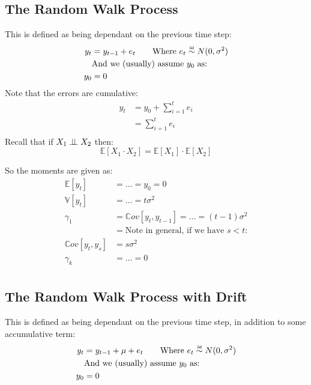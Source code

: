 \subsection{The Random Walk Process}
This is defined as being dependant on the previous time step:
\begin{equation*}
    \begin{aligned}
        y_t &= y_{t-1} + e_t \qquad \text{Where $e_t \iid N(0, \sigma^2)$} \\
            &\text{And we (usually) assume $y_0$ as:} \\
        y_0 &= 0 \\
    \end{aligned}
\end{equation*}
Note that the errors are cumulative:
\begin{equation*}
    \begin{aligned}
        y_t &= y_0 + \sum_{i=1}^{t} e_i \\
            &= \sum_{i=1}^{t} e_i \\
    \end{aligned}
\end{equation*}
Recall that if $X_1 \perp \!\!\! \perp X_2$ then:
\begin{equation*}
        \mathbb{E}[X_1 \cdot X_2] = \mathbb{E}[X_1] \cdot \mathbb{E}[X_2]
\end{equation*}

So the moments are given as:
\begin{equation*}
    \begin{aligned}
        \mathbb{E}[y_t] &= \dots = y_0 = 0  \\
        \mathbb{V}[y_t] &= \dots = t\sigma^2\\
        \gamma_1 &= \mathbb{C}ov[y_t, y_{t-1}] = \dots = (t-1) \sigma^2 \\
                 &= \text{Note in general, if we have $s < t$:} \\
        \mathbb{C}ov[y_t, y_s] &= s \sigma^2 \\
        \gamma_k &= \dots = 0 \\
    \end{aligned}
\end{equation*}


\subsection{The Random Walk Process with Drift}
This is defined as being dependant on the previous time step, in addition to
some accumulative term:
\begin{equation*}
    \begin{aligned}
        y_t &= y_{t-1} + \mu + e_t \qquad \text{Where $e_t \iid N(0, \sigma^2)$} \\
            &\text{And we (usually) assume $y_0$ as:} \\
        y_0 &= 0 \\
    \end{aligned}
\end{equation*}

